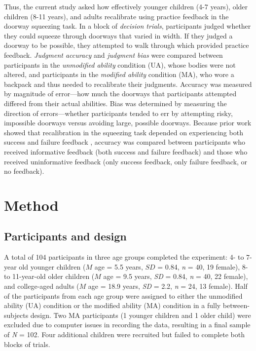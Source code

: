\documentclass[a4paper,man,natbib,floatsintext,noextraspace]{apa6}
\begin{document}
Thus, the current study asked how effectively younger children (4-7 years), older children (8-11 years), and adults recalibrate using practice feedback in the doorway squeezing task. In a block of \textit{decision trials}, participants judged whether they could squeeze through doorways that varied in width. If they judged a doorway to be possible, they attempted to walk through which provided practice feedback. \textit{Judgment accuracy} and \textit{judgment bias} were compared between participants in the \textit{unmodified ability} condition (UA), whose bodies were not altered, and participants in the \textit{modified ability} condition (MA), who wore a backpack and thus needed to recalibrate their judgments. Accuracy was measured by magnitude of error---how much the doorways that participants attempted differed from their actual abilities. Bias was determined by measuring the direction of errors---whether participants tended to err by attempting risky, impossible doorways versus avoiding large, possible doorways. Because prior work showed that recalibration in the squeezing task depended on experiencing both success and failure feedback \citep{DoorwayLearning}, accuracy was compared between participants who received informative feedback (both success and failure feedback) and those who received uninformative feedback (only success feedback, only failure feedback, or no feedback).

\section{Method}

\subsection{Participants and design}

A total of 104 participants in three age groups completed the experiment: 4- to 7-year old younger children ($M$ age = 5.5 years, $SD$ = 0.84, \textit{n} = 40, 19 female), 8- to 11-year-old older children ($M$ age = 9.5 years, \textit{SD} = 0.84, \textit{n} = 40, 22 female), and college-aged adults ($M$ age = 18.9 years, \textit{SD} = 2.2, \textit{n} = 24, 13 female). Half of the participants from each age group were assigned to either the unmodified ability (UA) condition or the modified ability (MA) condition in a fully between-subjects design. Two MA participants (1 younger children and 1 older child) were excluded due to computer issues in recording the data, resulting in a final sample of \textit{N} = 102. Four additional children were recruited but failed to complete both blocks of trials. 
\end{document}
